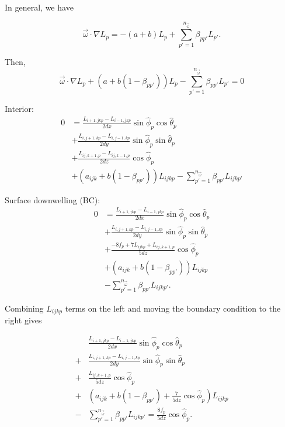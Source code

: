 
In general, we have

\begin{equation}
  \vec{\omega} \cdot \nabla L_p = -(a+b) L_p + \sum_{p'=1}^{n_{\vec{\omega}}} \beta_{pp'}L_{p'}.
\end{equation}

Then,
\begin{equation}
  \vec{\omega} \cdot \nabla L_p + (a+b(1-\beta_{pp'}))L_p - \sum_{p'=1}^{n_{\vec{\omega}}} \beta_{pp'} L_{p'} = 0
\end{equation}

Interior:
\begin{equation}
  \begin{aligned}
    0 &= \frac{L_{i+1,jkp}-L_{i-1,jkp}}{2dx}\sin\hat{\phi}_p\cos\hat{\theta}_p \\
    &+ \frac{L_{i,j+1,kp}-L_{i,j-1,kp}}{2dy}\sin\hat{\phi}_p\sin\hat{\theta}_p \\
    &+ \frac{L_{ij,k+1,p}-L_{ij,k-1,p}}{2dz}\cos\hat{\phi}_p \\
    &+ (a_{ijk}+b(1-\beta_{pp'}))L_{ijkp}  - \sum_{p'=1}^{n_{\vec{\omega}}} \beta_{pp'} L_{ijkp'}
  \end{aligned}
\end{equation}

Surface downwelling (BC):
\begin{equation*}
  \begin{aligned}
    0 &= \frac{L_{i+1,jkp}-L_{i-1,jkp}}{2dx}\sin\hat{\phi}_p\cos\hat{\theta}_p \\
    &+ \frac{L_{i,j+1,kp}-L_{i,j-1,kp}}{2dy}\sin\hat{\phi}_p\sin\hat{\theta}_p \\
    &+ \frac{-8f_p + 7L_{ijkp} + L_{ij,k+1,p}}{5dz}\cos\hat{\phi}_p \\
    &+ (a_{ijk}+b(1-\beta_{pp'}))L_{ijkp} \\
    &- \sum_{p'=1}^{n_{\vec{\omega}}} \beta_{pp'} L_{ijkp'}.
  \end{aligned}
\end{equation*}

Combining $L_{ijkp}$ terms on the left and moving the boundary condition to the
right gives

\begin{equation}
  \begin{aligned}
    &\frac{L_{i+1,jkp}-L_{i-1,jkp}}{2dx}\sin\hat{\phi}_p\cos\hat{\theta}_p \\
    + &\frac{L_{i,j+1,kp}-L_{i,j-1,kp}}{2dy}\sin\hat{\phi}_p\sin\hat{\theta}_p \\
    + &\frac{L_{ij,k+1,p}}{5dz}\cos\hat{\phi}_p \\
    + &(a_{ijk}+b(1-\beta_{pp'}) + \frac{7}{5dz} \cos\hat{\phi}_p)L_{ijkp} \\
    - &\sum_{p'=1}^{n_{\vec{\omega}}} \beta_{pp'} L_{ijkp'} = \frac{8f_p}{5dz} \cos\hat{\phi}_p.
  \end{aligned}
\end{equation}

